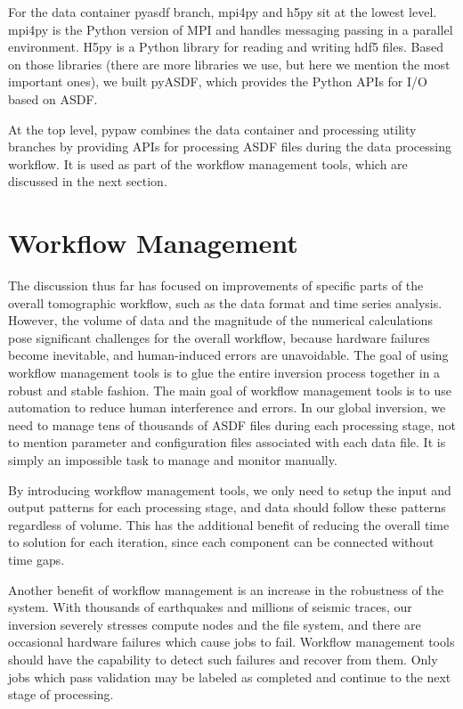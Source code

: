 For the data container pyasdf branch, mpi4py and h5py sit at the lowest level. mpi4py is the Python version of MPI and handles messaging passing in a parallel environment.
H5py is a Python library for reading and writing hdf5 files.
Based on those libraries (there are more libraries we use, but here we mention the most important ones), we built
pyASDF, which provides the Python APIs for I/O based on ASDF.

At the top level, pypaw combines the data container and processing utility branches
by providing APIs for processing ASDF files during the data processing workflow.
It is used as part of the workflow management tools, which are discussed in the next section.

\section{Workflow Management}
\label{section:workflow_management}

The discussion thus far has focused on improvements of specific parts of the overall tomographic workflow,
such as the data format and time series analysis.
However, the volume of data and the magnitude of the numerical calculations
pose significant challenges for the overall workflow,
because hardware failures become inevitable, and human-induced errors are unavoidable.
The goal of using workflow management tools is to glue the entire inversion process together in a robust and stable fashion.
The main goal of workflow management tools is to use automation to
reduce human interference and errors.
In our global inversion,
we need to manage tens of thousands of ASDF files during each processing stage,
not to mention parameter and configuration files associated with
each data file. It is simply an impossible task to manage and monitor
manually.

By introducing workflow management tools,
we only need to setup the input and output
patterns for each processing stage, and data should
follow these patterns regardless of volume.
This has the additional benefit of reducing the overall time to solution for each iteration, since
each component can be connected without time gaps. 

Another benefit of workflow management is an increase in the robustness of the system.
With thousands of earthquakes and millions of seismic traces,
our inversion severely stresses compute nodes and the file system, and there are occasional hardware failures which cause jobs to fail.
Workflow management tools should have the capability to
detect such failures and recover from them.
Only jobs which pass validation may be labeled as completed and continue to the next stage of processing.

